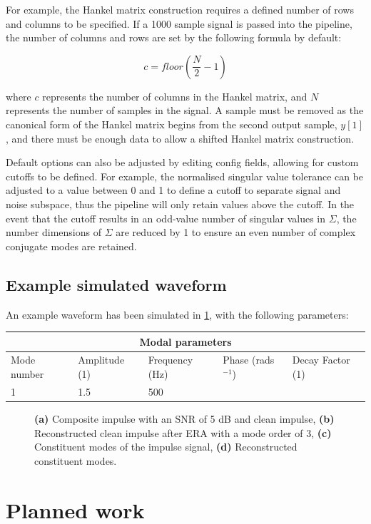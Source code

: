 For example, the Hankel matrix construction requires a defined number of rows and columns to be specified. If a 1000 sample signal is passed into the pipeline, the number of columns and rows are set by the following formula by default:

\begin{equation}
\label{eq:hankel-columns}
    c = floor \left(\frac{N}{2} - 1\right)
\end{equation}

where $c$ represents the number of columns in the Hankel matrix, and $N$ represents the number of samples in the signal. A sample must be removed as the canonical form of the Hankel matrix begins from the second output sample, $y[1]$, and there must be enough data to allow a shifted Hankel matrix construction.

Default options can also be adjusted by editing config fields, allowing for custom cutoffs to be defined.
For example, the normalised singular value tolerance can be adjusted to a value between 0 and 1 to define a cutoff to separate signal and noise subspace, thus the pipeline will only retain values above the cutoff. In the event that the cutoff results in an odd-value number of singular values in $\Sigma$, the number dimensions of $\Sigma$ are reduced by 1 to ensure an even number of complex conjugate modes are retained.

\subsection{Example simulated waveform}

An example waveform has been simulated in \ref{fig:example}, with the following parameters:


\begin{table}[h!]
    \begin{tabular}{ |p{2cm}|p{2cm}|p{2cm}|p{2cm}|p{2cm}|}
        \hline
        \multicolumn{5}{|c|}{Modal parameters}\\
        \hline
        Mode number & Amplitude (1) & Frequency (Hz) & Phase (rads$^{-1}$) & Decay Factor (1) \\
        \hline
        1 & 1.5 & 500 \\
        \hline
    \end{tabular}
\end{table}

\begin{figure}
\label{fig:example}
\caption{\textnormal{\textbf{(a)}} Composite impulse with an SNR of 5 dB and clean impulse, \textnormal{\textbf{(b)}} Reconstructed clean impulse after ERA with a mode order of 3, \textnormal{\textbf{(c)}} Constituent modes of the impulse signal, \textnormal{\textbf{(d)}} Reconstructed constituent modes.}
\end{figure}



\section{Planned work}
\label{sec:plan}

